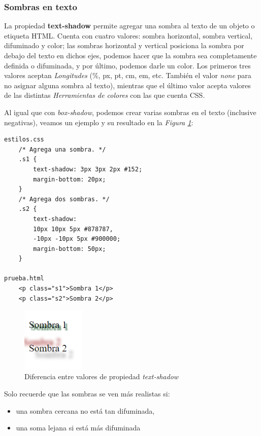 \subsubsection{Sombras en texto}

La propiedad \textbf{text-shadow} permite agregar una sombra al texto de un objeto o etiqueta HTML. Cuenta con cuatro valores: sombra horizontal, sombra vertical, difuminado y color; las sombras horizontal y vertical posiciona la sombra por debajo del texto en dichos ejes, podemos hacer que la sombra sea completamente definida o difuminada, y por último, podemos darle un color. Los primeros tres valores aceptan \textit{Longitudes} (\%, px, pt, cm, em, etc. También el valor \textit{none} para no asignar alguna sombra al texto), mientras que el último valor acepta valores de las distintas \textit{Herramientas de colores} con las que cuenta CSS.

Al igual que con \textit{box-shadow}, podemos crear varias sombras en el texto (inclusive negativas), veamos un ejemplo y su resultado en la \textit{Figura \ref{fig: 36}}:
\begin{lstlisting}
estilos.css
    /* Agrega una sombra. */
    .s1 {
        text-shadow: 3px 3px 2px #152;
        margin-bottom: 20px;
    }
    /* Agrega dos sombras. */
    .s2 {
        text-shadow: 
        10px 10px 5px #878787,
        -10px -10px 5px #900000;
        margin-bottom: 50px;
    }

prueba.html
    <p class="s1">Sombra 1</p>
    <p class="s2">Sombra 2</p>
\end{lstlisting}
\begin{figure}[H]
    \centering
    \caption{Diferencia entre valores de propiedad \textit{text-shadow}}
    \label{fig: 36}
    \includegraphics[width=3cm]{ss/text-shadow.png}
\end{figure}

Solo recuerde que las sombras se ven más realistas si:
\begin{itemize}
    \item una sombra cercana no está tan difuminada,
    \item una soma lejana si está más difuminada
\end{itemize}


